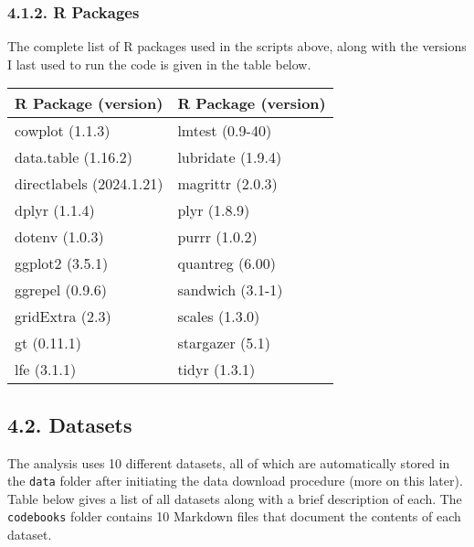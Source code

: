 \documentclass[10pt]{article}
\newenvironment{eightpt}{\begingroup\fontsize{8}{13}\selectfont}{\endgroup}
\begin{document}
\subsubsection*{4.1.2. R Packages}

The complete list of R packages used in the scripts above, along with the versions I last used to run the code is given in the table below.

\begin{eightpt}
\begin{tabularx}{\textwidth}{TT}
\toprule
R Package (version) & R Package (version) \\
\midrule
cowplot (1.1.3)          & lmtest (0.9-40)           \\
data.table (1.16.2)      & lubridate (1.9.4)         \\
directlabels (2024.1.21) & magrittr (2.0.3)          \\
dplyr (1.1.4)            & plyr (1.8.9)              \\
dotenv (1.0.3)           & purrr (1.0.2)             \\
ggplot2 (3.5.1)          & quantreg (6.00)           \\
ggrepel (0.9.6)          & sandwich (3.1-1)          \\
gridExtra (2.3)          & scales (1.3.0)            \\
gt (0.11.1)              & stargazer (5.1)           \\
lfe (3.1.1)              & tidyr (1.3.1)             \\
\bottomrule
\end{tabularx}
\end{eightpt}

\subsection*{4.2. Datasets}

The analysis uses 10 different datasets, all of which are automatically stored in the \texttt{data} folder after initiating the data download procedure (more on this later).
Table below gives a list of all datasets along with a brief description of each.
The \texttt{codebooks} folder contains 10 Markdown files that document the contents of each dataset.
\end{document}
